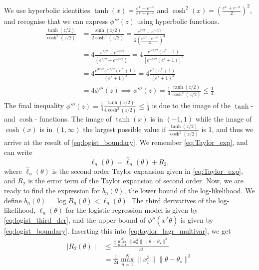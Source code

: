 We use hyperbolic identities $\tanh(x) =  \frac{e^x - e^{-x}}{e^x + e^{-x}}$ and $\cosh^2(x) = \left(\frac{e^x + e^{-x}}{2}\right)^2$, and recognise that we can express $\phi'''\left(z\right)$ using hyperbolic functions.
\begin{equation}\label{eq:logist_boundary}
\begin{split}
\frac{\tanh(z/2)}{\cosh^2(z/2)}  &= \frac{\sinh(z/2)}{2\cosh^3(z/2)} 
= \frac{e^{z/2} - e^{-z/2}}{2\left(\frac{e^{z/2} + e^{-z/2}}{2}\right)^3} \\
& = 4\frac{e^{z/2} - e^{-z/2}}{\left(e^{z/2} + e^{-z/2}\right)^3}
 = 4\frac{e^{-z/2}\left(e^z -1\right)}{\left[e^{-z/2}\left(e^z + 1\right)\right]^3} \\
& = 4\frac{e^{3z/2}e^{-z/2}\left(e^z+1\right)}{\left(e^z + 1\right)^3} 
 = 4 \frac{e^z\left(e^z + 1\right)}{\left(e^z +1 \right)^3} \\
& = 4\phi'''(z) 
\implies \phi'''(z) = \frac{1}{4}\frac{\tanh(z/2)}{\cosh^2(z/2)} \leq \frac{1}{4}
\end{split}
\end{equation}
The final inequality $\phi'''\left(z\right) = \frac{1}{4}\frac{\tanh\left(z/2\right)}{4\cosh^2\left(z/2\right)} \leq \frac{1}{4}$ is due to the image of the $\tanh$- and $\cosh$- functions.
The image of $\tanh\left(x\right)$ is in $\left(-1, 1\right)$  while the image of $\cosh\left(x\right)$ is in $\left(1, \infty\right)$ the largest possible value if $\frac{\tanh\left(z/2\right)}{\cosh^2\left(z/2\right)}$ is 1, and thus we arrive at the result of \eqref{eq:logist_boundary}.  
We remember \eqref{eq:Taylor_exp}, and can write 
\begin{equation}
    \ell_n\left(\theta\right) = \hat{\ell}_n\left(\theta\right) + R_2, 
\end{equation}
where $\hat{\ell}_n\left(\theta\right)$ is the second order Taylor expansion given in \eqref{eq:Taylor_exp}, and $R_2$ is the error term of the Taylor expansion of second order. Now, we are ready to find the expression for  $b_n\left(\theta\right)$, the lower bound of the log-likelihood. We define $b_n\left(\theta\right) = \log B_n\left(\theta\right) < \ell_n\left(\theta\right)$. The third derivatives of the log-likelihood, $\ell_n\left(\theta\right)$ for the logistic regression model is given by \eqref{eq:logist_third_der}, and the upper bound of $\phi''\left(x^T \theta\right)$ is given by \eqref{eq:logist_boundary}. Inserting this into \eqref{eq:taylor_lagr_multivar}, we get
\begin{equation}\label{eq:error_bound_taylor}
\begin{split}
    \mid R_2\left(\theta\right) \mid &\leq \frac{\frac{1}{4}\max_{n=1}^N \lVert x_n^3 \rVert \lVert\theta - \theta_{\star}\rVert^3}{3!} \\
    & = \frac{1}{24} \max_{n=1}^N \lVert x_i^3\rVert \lVert\theta-\theta_{\star}\rVert^3
    \end{split}
\end{equation}

